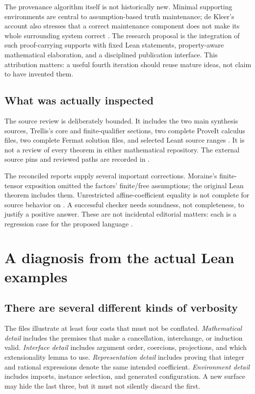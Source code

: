\documentclass[11pt,a4paper]{article}
\theoremstyle{definition}
\theoremstyle{remark}
\newcommand{\code}[1]{\texttt{\detokenize{#1}}}
\begin{document}
The provenance algorithm itself is not historically new. Minimal supporting
environments are central to assumption-based truth maintenance; de Kleer's
account also stresses that a correct maintenance component does not make its
whole surrounding system correct \cite{atms}. The research proposal is the
integration of such proof-carrying supports with fixed Lean statements,
property-aware mathematical elaboration, and a disciplined publication interface.
This attribution matters: a useful fourth iteration should reuse mature ideas,
not claim to have invented them.

\subsection{What was actually inspected}
The source review is deliberately bounded. It includes the two main synthesis
sources, Trellis's core and finite-qualifier sections, two complete ProveIt
calculus files, two complete Fermat solution files, and selected Leant source
ranges \cite{synA,synB,trellis,qpoch,ode,frey,tensor,leantV,leantH}.
It is not a review of every theorem in either mathematical repository. The
external source pins and reviewed paths are recorded in
\code{evidence/source_manifest.json}.

The reconciled reports supply several important corrections. Moraine's
finite-tensor exposition omitted the factors' finite/free assumptions; the
original Lean theorem includes them. Unrestricted affine-coefficient equality
is not complete for source behavior on \code{List Empty}. A successful checker
needs soundness, not completeness, to justify a positive answer. These are
not incidental editorial matters: each is a regression case for the proposed
language \cite{synA,synB}.

\section{A diagnosis from the actual Lean examples}
\label{sec:diagnosis}

\subsection{There are several different kinds of verbosity}
The files illustrate at least four costs that must not be conflated.
\emph{Mathematical detail} includes the premises that make a cancellation,
interchange, or induction valid. \emph{Interface detail} includes argument order,
coercions, projections, and which extensionality lemma to use.
\emph{Representation detail} includes proving that integer and rational
expressions denote the same intended coefficient. \emph{Environment detail}
includes imports, instance selection, and generated configuration. A new surface
may hide the last three, but it must not silently discard the first.
\end{document}

